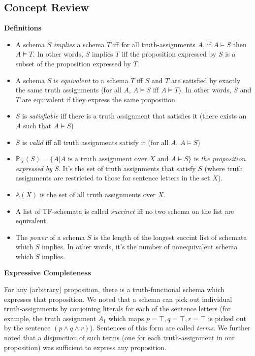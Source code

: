 \newpage
\begin{mdframed}[linewidth=1]
\section*{Concept Review}
\textbf{Definitions}
\begin{itemize}
    \item A schema $S$ \emph{implies} a schema $T$ iff for all truth-assignments $A$, if $A \models S$ then $A \models T$. In other words, $S$ implies $T$ iff the proposition expressed by $S$ is a subset of the proposition expressed by $T$. 
    \item A schema $S$ is \emph{equivalent} to a schema $T$ iff $S$ and $T$ are satisfied by exactly the same truth assignments (for all $A$, $A \models S$ iff $A \models T$). In other words, $S$ and $T$ are equivalent if they express the same proposition. 
    \item $S$ is \emph{satisfiable} iff there is a truth assignment that satisfies it (there exists an $A$ such that $A \models S$)
    \item $S$ is \emph{valid} iff all truth assignments satisfy it (for all $A$, $A \models S$)
    \item $\mathbb{P}_X(S) = \{A | A \text{ is a truth assignment over } X \text{ and } A \models S\}$ is \emph{the proposition expressed by S}. It's the set of truth assignments that satisfy $S$ (where truth assignments are restricted to those for sentence letters in the set $X$). 
    \item $\mathbb{A}(X)$ is the set of all truth assignments over $X$. 
    \item A list of TF-schemata is called \emph{succinct} iff no two schema on the list are equivalent. 
    \item The \emph{power} of a schema $S$ is the length of the longest succint list of schemata which $S$ implies. In other words, it's the number of nonequivalent schema which $S$ implies. 
\end{itemize}

\textbf{Expressive Completeness}

For any (arbitrary) proposition, there is a truth-functional schema which expresses that proposition. We noted that a schema can pick out individual truth-assignments by conjoining literals for each of the sentence letters (for example, the truth assignment $A_1$ which maps $p = \top, q = \top, r = \top$ is picked out by the sentence $(p \land q \land r)$). Sentences of this form are called \emph{terms}. We further noted that a disjunction of such terms (one for each truth-assignment in our proposition) was sufficient to express any proposition. 


\end{mdframed}
